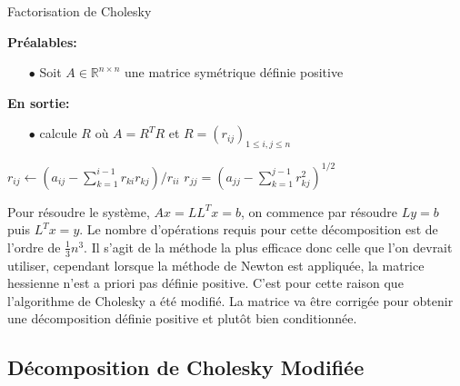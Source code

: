 \begin{description}
\begin{algorithm}                     %
\caption{Factorisation de Cholesky}          %
\label{alg:chol}                           %
\begin{algorithmic}
\STATE \textbf{Pr\'ealables:} %
\begin{itemize}
\item[$\bullet$] Soit $A \in \mathbb{R}^{n\times n}$ une matrice sym\'etrique d\'efinie positive
\end{itemize}
\STATE \textbf{En sortie:} %
\begin{itemize}
\item[$\bullet$] calcule $R$ o\`u $A=R^TR$ et $R=(r_{ij})_{1\leq i,j\leq n}$
\end{itemize}
\STATE $r_{ij}\leftarrow(a_{ij}-\sum_{k=1}^{i-1}r_{ki}r_{kj})/r_{ii}$
\ENDFOR
\STATE $r_{jj}=(a_{jj}-\sum_{k=1}^{j-1}r_{kj}^2)^{1/2}$
\ENDFOR
\end{algorithmic}
\end{algorithm}


Pour r\'esoudre le syst\`eme, $Ax = LL^Tx = b$, on commence par r\'esoudre $Ly=b$ puis $L^Tx=y$.
Le nombre d'op\'erations requis pour cette d\'ecomposition est de l'ordre de $\frac{1}{3}n^3$. Il s'agit de la m\'ethode
la plus efficace donc celle que l'on devrait utiliser, cependant lorsque la m\'ethode de Newton est appliqu\'ee,
la matrice hessienne n'est a priori pas d\'efinie positive. C'est pour cette raison que l'algorithme de Cholesky a \'et\'e
modifi\'e. La matrice va être corrig\'ee pour obtenir une d\'ecomposition d\'efinie positive
 et plutôt bien conditionn\'ee.
\end{description}


\subsection{D\'ecomposition de Cholesky Modifi\'ee}
\label{chap1:decomposition}

